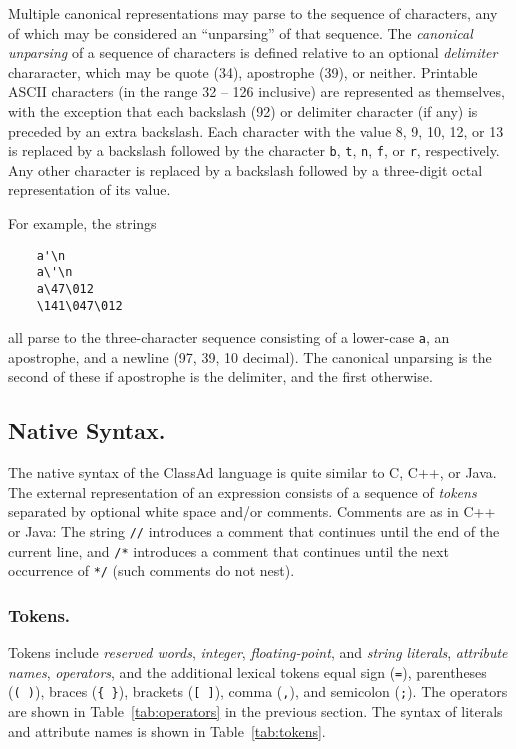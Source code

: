 \documentclass{article}
\begin{document}
Multiple canonical representations may parse to the sequence of characters, any
of which may be considered an ``unparsing'' of that sequence.
The \emph{canonical unparsing} of a sequence of characters is defined relative
to an optional \emph{delimiter} chararacter, which may be quote (34),
apostrophe (39), or neither.
Printable ASCII characters (in the range 32 -- 126 inclusive) are represented
as themselves,  with the exception that each backslash (92) or delimiter
character (if any) is preceded by an extra backslash.
Each character with the value 8, 9, 10, 12, or 13 is replaced by a backslash
followed by the character \verb/b/, \verb/t/, \verb/n/, \verb/f/, or \verb/r/,
respectively.
Any other character is replaced by a backslash followed by a three-digit octal
representation of its value.

For example, the strings
\begin{verbatim}
    a'\n
    a\'\n
    a\47\012
    \141\047\012
\end{verbatim}
all parse to the three-character sequence consisting of a lower-case \verb/a/,
an apostrophe, and a newline (97, 39, 10 decimal).  The canonical unparsing
is the second of these if apostrophe is the delimiter, and the first otherwise.

\subsection{Native Syntax.}
\label{sec:native_syntax}

The native syntax of the ClassAd language is quite similar to C, C++, or Java.
The external representation of an expression consists of a sequence of
\emph{tokens} separated by optional white space and/or comments.  Comments are
as in C++ or Java:  The string \texttt{//} introduces a comment that continues
until the end of the current line, and \texttt{/*} introduces a comment that
continues until the next occurrence of \texttt{*/} (such comments do not nest).

\subsubsection{Tokens.}
Tokens include \emph{reserved words}, \emph{integer}, \emph{floating-point},
and \emph{string literals}, \emph{attribute names}, \emph{operators}, and the
additional lexical
tokens
equal sign (\texttt{=}),
parentheses (\texttt{(~)}),
braces (\verb|{ }|),
brackets (\texttt{[~]}),
comma (\texttt{,}), and
semicolon (\texttt{;}).
The operators are shown in Table~\ref{tab:operators} in the previous section.
The syntax of literals and attribute names is shown in Table~\ref{tab:tokens}.
\end{document}
